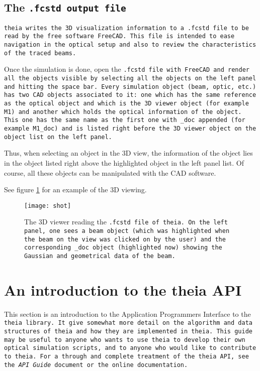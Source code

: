 \documentclass{article}
\begin{document}
\subsection{The \tt{.fcstd} output file}

\tt{theia} writes the 3D visualization information to a \tt{.fcstd} file to be read by the free software \tt{FreeCAD}. This file is intended to ease navigation in the optical setup and also to review the characteristics of the traced beams.

Once the simulation is done, open the \tt{.fcstd} file with \tt{FreeCAD} and render all the objects visible by selecting all the objects on the left panel and hitting the space bar. Every simulation object (beam, optic, etc.) has two CAD objects associated to it: one which has the same reference as the optical object and which is the 3D viewer object (for example \tt{M1}) and another which holds the optical information of the object. This one has the same name as the first one with \tt{\_doc} appended (for example \tt{M1\_doc}) and is listed right before the 3D viewer object on the object list on the left panel.

Thus, when selecting an object in the 3D view, the information of the object lies in the object listed right above the highlighted object in the left panel list. Of course, all these objects can be manipulated with the CAD software.

See figure \ref{shot} for an example of the 3D viewing.

\begin{figure}[h]
\begin{center}
\texttt{[image: shot]}
\end{center}
\caption{The 3D viewer reading the \tt{.fcstd} file of \tt{theia}. On the left panel, one sees a beam object (which was highlighted when the beam on the view was clicked on by the user) and the corresponding \tt{\_doc} object (highlighted now) showing the Gaussian and geometrical data of the beam.}
\label{shot}
\end{figure}


\newpage
\section{An introduction to the theia API}

This section is an introduction to the Application Programmers Interface to the \tt{theia} library. It give somewhat more detail on the algorithm and data structures of theia and how they are implemented in \tt{theia}. This guide may be useful to anyone who wants to use \tt{theia} to develop their own optical simulation scripts, and to anyone who would like to contribute to \tt{theia}. For a through and complete treatment of the \tt{theia} API, see the \textit{API Guide} document or the online documentation.
\end{document}
